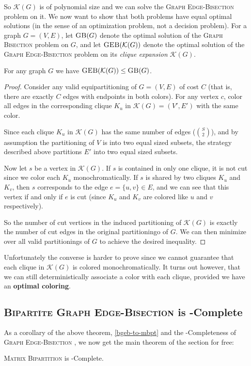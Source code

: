 \documentclass{article}
\newcommand{\mbpt}{\textsc{Matrix \allowbreak Bipartition} }
\newcommand{\gb}{\textsc{Graph \allowbreak Bisection} }
\newcommand{\geb}{\textsc{Graph \allowbreak Edge-\allowbreak Bisection} }
\newcommand{\bgeb}{
	\textsc{Bipartite \allowbreak Graph \allowbreak Edge-\allowbreak Bisection}
 }
\newcommand{\sgeb}{\textsc{GEB} }
\newcommand{\sgb}{\textsc{GB} }
\begin{document}
	So $\mathcal{K}(G)$ is of polynomial size and we can solve the \geb problem
	on it. We now want to show that both problems have equal optimal solutions (in
	the sense of an optimization problem, not a decision problem). For
	a graph $G=(V, E)$, let $\sgb(G)$ denote the optimal solution of the \gb
	problem on $G$, and let $\sgeb(\mathcal{K}(G))$ denote the optimal solution of
	the \geb problem on its \textit{clique expansion} $\mathcal{K}(G)$.

	\begin{proposition}
		\label{geb-leq-gb}
		For any graph $G$ we have $\sgeb(\mathcal{K}(G)) \leq \sgb(G)$.
	\end{proposition}
	\begin{proof}
		Consider any valid equipartitioning of $G = (V, E)$ of cost $C$ (that
		is, there are
		exactly $C$ edges with endpoints in both colors). For any vertex $c$,
		color all edges in the corresponding clique $K_u$ in $\mathcal{K}(G)
			= (V', E')$ with the same color.

		Since each clique $K_u$ in $\mathcal{K}(G)$ has the same number of
		edges ($\binom{S}{2}$), and by
		assumption the partitioning of $V$ is into two equal sized subsets, the
		strategy described above partitions $E'$ into two equal sized subsets.

		Now let $s$ be a vertex in $\mathcal{K}(G)$. If $s$ is contained in only
		one clique, it is not cut
		since we color each $K_u$ monochromatically. If $s$ is shared by two
		cliques $K_u$ and $K_v$, then $s$ corresponds to the edge
		$e = \{u, v\} \in E$, and
		we can see that this vertex if and only if $e$ is cut (since $K_u$ and
		$K_v$ are colored like $u$ and $v$ respectively).

		So the number of cut vertices in the induced partitioning of
		$\mathcal{K}(G)$ is exactly the number of cut edges in the original
		partitioningo of $G$. We can then minimize over all valid partitionings
		of $G$ to achieve the desired inequality.
	\end{proof}

	Unfortunately the converse is harder to prove since we cannot guarantee
	that each clique in $\mathcal{K}(G)$ is colored monochromatically. It turns
	out however, that we can still deterministically associate a color with each
	clique, provided we have an \textbf{optimal coloring}.

	\subsection{\bgeb is \NP-Complete}

	As a corollary of the above theorem, \ref{bgeb-to-mbpt} and the
	\NP-Completeness of \geb, we now get the main theorem of the section
	for free:

	\begin{theorem}
		\mbpt is \NP-Complete.
	\end{theorem}
	
\end{document}
